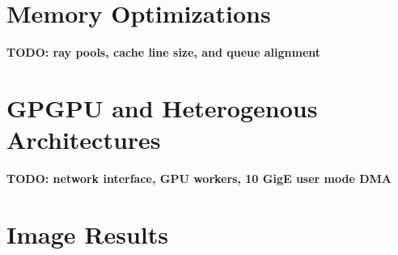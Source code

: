\documentclass[12pt]{ucthesis}
\begin{document}
\section{Memory Optimizations}
\label{memory}

\textbf{TODO: ray pools, cache line size, and queue alignment}

\section{GPGPU and Heterogenous Architectures}
\label{hetergenous}

\textbf{TODO: network interface, GPU workers, 10 GigE user mode DMA}

\clearpage



\section*{Image Results}
\end{document}
